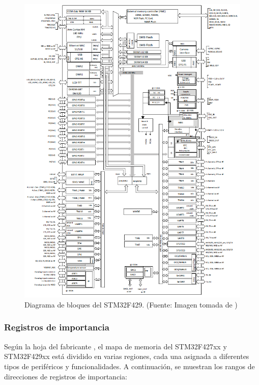 \begin{figure}[H]
\centering
\includegraphics[width=160mm]{./Figuras/Nota_teorica/Bloques}
\caption{Diagrama de bloques del STM32F429. (Fuente: Imagen tomada de \cite{ST})}
\label{fig:DBLO}
\end{figure}



\subsubsection{Registros de importancia}
Según la hoja del fabricante \cite{ST}, el mapa de memoria del STM32F427xx y STM32F429xx está dividido en varias regiones, cada una asignada a diferentes tipos de periféricos y funcionalidades. A continuación, se muestran los rangos de direcciones de registros de importancia:

